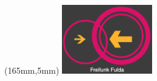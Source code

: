 \documentclass[11pt, a4paper,ngerman]{article}
\begin{document}
\newpage
\begin{textblock*}{30mm}(165mm,5mm)
\includegraphics[height=30mm,width=39mm]{./FFLogo.png}\\
\end{textblock*}





\color{white}



\end{document}
